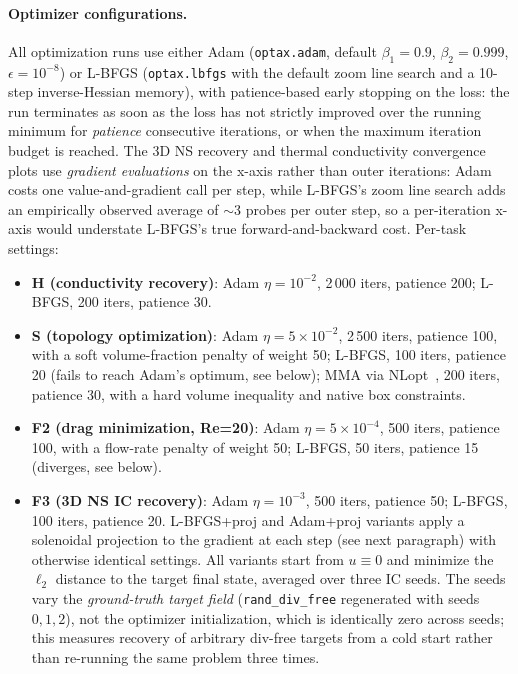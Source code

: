 \documentclass{article}
\begin{document}
\paragraph{Optimizer configurations.}
All optimization runs use either Adam (\texttt{optax.adam}, default
$\beta_1{=}0.9$, $\beta_2{=}0.999$, $\epsilon{=}10^{-8}$) or L-BFGS
(\texttt{optax.lbfgs} with the default zoom line search and a 10-step
inverse-Hessian memory), with patience-based early stopping on the loss:
the run terminates as soon as the loss has not strictly improved over
the running minimum for \emph{patience} consecutive iterations, or when
the maximum iteration budget is reached.
The 3D NS recovery and thermal conductivity convergence plots use
\emph{gradient evaluations} on the x-axis rather than outer iterations:
Adam costs one value-and-gradient call per step, while L-BFGS's zoom line
search adds an empirically observed average of $\sim$3 probes per outer
step, so a per-iteration x-axis would understate L-BFGS's true
forward-and-backward cost.
Per-task settings:
\begin{itemize}\itemsep0pt
  \item \textbf{H (conductivity recovery)}: Adam $\eta{=}10^{-2}$,
        2\,000 iters, patience 200; L-BFGS, 200 iters, patience 30.
  \item \textbf{S (topology optimization)}: Adam $\eta{=}5{\times}10^{-2}$,
        2\,500 iters, patience 100, with a soft volume-fraction penalty
        of weight 50; L-BFGS, 100 iters, patience 20 (fails to reach Adam's optimum, see below);
        MMA via NLopt~\citep{svanberg1987mma}, 200 iters, patience 30,
        with a hard volume inequality and native box constraints.
  \item \textbf{F2 (drag minimization, Re=20)}: Adam $\eta{=}5{\times}10^{-4}$,
        500 iters, patience 100, with a flow-rate penalty of weight 50;
        L-BFGS, 50 iters, patience 15 (diverges, see below).
  \item \textbf{F3 (3D NS IC recovery)}: Adam $\eta{=}10^{-3}$, 500 iters,
        patience 50; L-BFGS, 100 iters, patience 20.
        L-BFGS+proj and Adam+proj variants apply a solenoidal projection to
        the gradient at each step (see next paragraph) with otherwise
        identical settings. All variants start from $u\equiv 0$ and minimize
        the $\ell_2$ distance to the target final state, averaged over three
        IC seeds. The seeds vary the \emph{ground-truth target field}
        (\texttt{rand\_div\_free} regenerated with seeds $0,1,2$), not the
        optimizer initialization, which is identically zero across seeds;
        this measures recovery of arbitrary div-free targets from a cold
        start rather than re-running the same problem three times.
\end{itemize}
\end{document}
